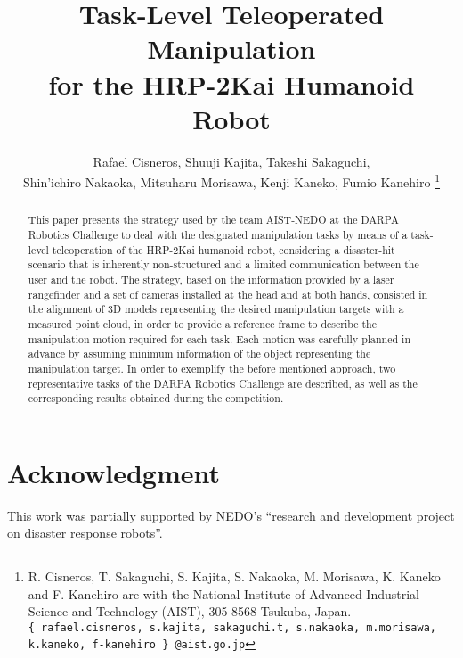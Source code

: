 \documentclass[letterpaper, 10 pt, conference]{ieeeconf}
\begin{document}
	\title{\LARGE \bf Task-Level Teleoperated Manipulation \\ for the HRP-2Kai Humanoid Robot}

	\author{Rafael Cisneros, Shuuji Kajita, Takeshi Sakaguchi, \\
					Shin'ichiro Nakaoka, Mitsuharu Morisawa, Kenji Kaneko, Fumio Kanehiro
	\thanks{R. Cisneros, T. Sakaguchi, S. Kajita, S. Nakaoka, M. Morisawa, K. Kaneko and F. Kanehiro
					are with the National Institute of Advanced Industrial Science and Technology (AIST),
					305-8568 Tsukuba, Japan.
					{\tt\small \{~rafael.cisneros, s.kajita, sakaguchi.t,
					s.nakaoka, m.morisawa, k.kaneko, f-kanehiro~\} @aist.go.jp}}}
  
	\maketitle

	\thispagestyle{empty}
	\pagestyle{empty}

	\begin{abstract}
		This paper presents the strategy used by the team AIST-NEDO at the DARPA Robotics Challenge to deal
		with the designated manipulation tasks by means of a task-level teleoperation of the HRP-2Kai humanoid robot,
		considering a disaster-hit scenario that is inherently non-structured and a limited communication between the
		user and the robot.
		The strategy, based on the information provided by a laser rangefinder and a set of cameras installed
		at the head and at both hands, consisted in the alignment of 3D models representing the desired manipulation
		targets with a measured point cloud, in order to provide a reference frame to describe the manipulation motion
		required for each task.
		Each motion was carefully planned in advance by assuming minimum information of the object representing the
		manipulation target.
		In order to exemplify the before mentioned approach, two representative tasks of the DARPA Robotics Challenge
		are described, as well as the corresponding results obtained during the competition.
	\end{abstract}

	
	
		
	
	
	
	
	
	
	
	
	
	
	
	\section*{Acknowledgment}
	
		This work was partially supported by NEDO's ``research and development project on disaster response robots''.
	
	
	
	
\end{document}
